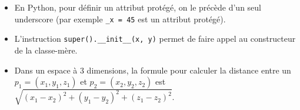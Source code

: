 \begin{Exercice}[15 minutes]
    \begin{conseil}
        \begin{itemize}
            \item En Python, pour définir un attribut protégé, on le précède d'un seul underscore (par exemple \lstinline{_x = 45} est un attribut protégé).
            \item L'instruction \lstinline{super().__init__(x, y)} permet de faire appel au constructeur de la classe-mère.
            \item Dans un espace à 3 dimensions, la formule pour calculer la distance entre un $p_1 = (x_1, y_1, z_1)$ et $p_2 = (x_2, y_2, z_2)$ est $\sqrt{(x_1 - x_2)^2 + (y_1 - y_2)^2 + (z_1 - z_2)^2}$.
        \end{itemize}
    \end{conseil}
    \begin{solution}
     
    \end{solution}
    \end{Exercice} 
    

